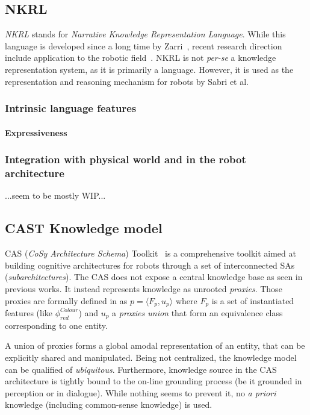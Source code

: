 \documentclass[a4paper, twocolumn]{article}
\begin{document}
\subsection{NKRL}
\label{sect|nkrl}

\emph{NKRL} stands for \emph{Narrative Knowledge Representation Language}.
While this language is developed since a long time by Zarri~\cite{Zarri1997,
Zarri2008}, recent research direction include application to the robotic
field~\cite{Sabri2011}. NKRL is not {\it per-se} a knowledge representation
system, as it is primarily a language. However, it is used as the
representation and reasoning mechanism for robots by Sabri et al.

\subsubsection{Intrinsic language features}
\label{sect|nkrl-intrinsic-features}

\paragraph{Expressiveness}

\subsubsection{Integration with physical world and in the robot architecture}
\label{sect|nkrl-integration}

...seem to be mostly WIP...


\subsection{CAST Knowledge model}
\label{sect|cast}

CAS (\emph{CoSy Architecture Schema}) Toolkit~\cite{Hawes2007} is a
comprehensive toolkit aimed at building cognitive architectures for robots
through a set of interconnected SAs (\emph{subarchitectures}). The CAS does not
expose a central knowledge base as seen in previous works. It instead
represents knowledge as unrooted \emph{proxies}. Those proxies are formally
defined in \cite{Jacobsson2008} as $p= \langle F_p, u_p \rangle$ where $F_p$ is
a set of instantiated features (like $\phi^{Colour}_{red}$) and $u_p$ a
\emph{proxies union} that form an equivalence class corresponding to one
entity.

A union of proxies forms a global amodal representation of an entity, that can
be explicitly shared and manipulated. Being not centralized, the knowledge
model can be qualified of \emph{ubiquitous}. Furthermore, knowledge source in
the CAS architecture is tightly bound to the on-line grounding process (be it
grounded in perception or in dialogue). While nothing seems to prevent it, no
{\it a priori} knowledge (including common-sense knowledge) is used.
\end{document}
